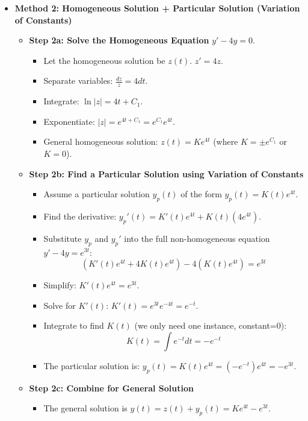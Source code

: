 \begin{cascade}
\begin{itemize}
		\item \textbf{Method 2: Homogeneous Solution + Particular Solution (Variation of Constants)}
		      \begin{itemize}
			      \item \textbf{Step 2a: Solve the Homogeneous Equation} $y' - 4y = 0$.
			            \begin{itemize}
				            \item Let the homogeneous solution be $z(t)$. $z' = 4z$.
				            \item Separate variables: $\frac{dz}{z} = 4 dt$.
				            \item Integrate: $\ln|z| = 4t + C_1$.
				            \item Exponentiate: $|z| = e^{4t + C_1} = e^{C_1} e^{4t}$.
				            \item General homogeneous solution: $z(t) = K e^{4t}$ (where $K = \pm e^{C_1}$ or $K=0$).
			            \end{itemize}
			      \item \textbf{Step 2b: Find a Particular Solution using Variation of Constants}
			            \begin{itemize}
				            \item Assume a particular solution $y_p(t)$ of the form $y_p(t) = K(t) e^{4t}$.
				            \item Find the derivative: $y_p'(t) = K'(t) e^{4t} + K(t) (4e^{4t})$.
				            \item Substitute $y_p$ and $y_p'$ into the full non-homogeneous equation $y' - 4y = e^{3t}$:
				                  $$ (K'(t) e^{4t} + 4K(t) e^{4t}) - 4(K(t) e^{4t}) = e^{3t} $$
				            \item Simplify: $K'(t) e^{4t} = e^{3t}$.
				            \item Solve for $K'(t)$: $K'(t) = e^{3t} e^{-4t} = e^{-t}$.
				            \item Integrate to find $K(t)$ (we only need one instance, constant=0):
				                  $$ K(t) = \int e^{-t} dt = -e^{-t} $$
				            \item The particular solution is: $y_p(t) = K(t) e^{4t} = (-e^{-t}) e^{4t} = -e^{3t}$.
			            \end{itemize}
			      \item \textbf{Step 2c: Combine for General Solution}
			            \begin{itemize}
				            \item The general solution is $y(t) = z(t) + y_p(t) = K e^{4t} - e^{3t}$.

\end{itemize}
\end{itemize}
\end{itemize}
\end{cascade}

